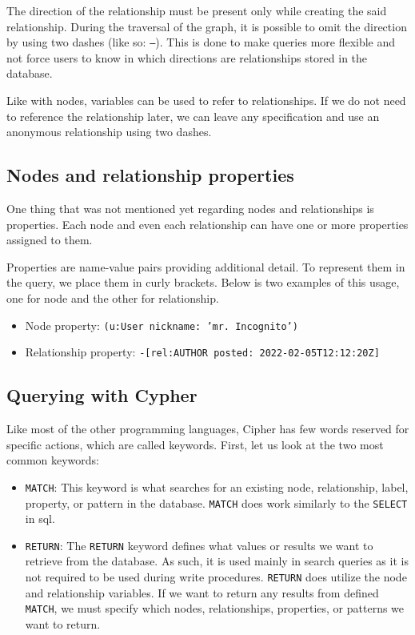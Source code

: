 The direction of the relationship must be present only while creating the said relationship.
During the traversal of the graph, it is possible to omit the direction by using two dashes (like so: \texttt{--}).
This is done to make queries more flexible and not force users to know in which directions are relationships stored in the database.

Like with nodes, variables can be used to refer to relationships. If we do not need to reference the relationship later,
we can leave any specification and use an anonymous relationship using two dashes.

\subsection{Nodes and relationship properties}

One thing that was not mentioned yet regarding nodes and relationships is properties. Each node and even each relationship can have one or more properties assigned to them.

Properties are name-value pairs providing additional detail. To represent them in the query, we place them in curly brackets. \cite{noauthor_getting_nodate}
Below is two examples of this usage, one for node and the other for relationship.

\begin{itemize}
    \item {Node property: \texttt{(u:User {nickname: 'mr. Incognito'})}}
    \item {Relationship property: \texttt{-[rel:AUTHOR {posted: 2022-02-05T12:12:20Z}]}}
\end{itemize}

\subsection{Querying with Cypher}

Like most of the other programming languages, Cipher has few words reserved for specific actions, which are called keywords. \cite{noauthor_querying_nodate} First, let us look at the two most common keywords:
\begin{itemize}
    \item {\texttt{MATCH}: This keyword is what searches for an existing node, relationship, label, property, or pattern in the database. \texttt{MATCH} does work similarly to the \texttt{SELECT} in \acrshort{sql}.}
    \item {\texttt{RETURN}: The \texttt{RETURN} keyword defines what values or results we want to retrieve from the database.
          As such, it is used mainly in search queries as it is not required to be used during write procedures.
          \texttt{RETURN} does utilize the node and relationship variables. If we want to return any results from defined \texttt{MATCH},
          we must specify which nodes, relationships, properties, or patterns we want to return.}
\end{itemize}

